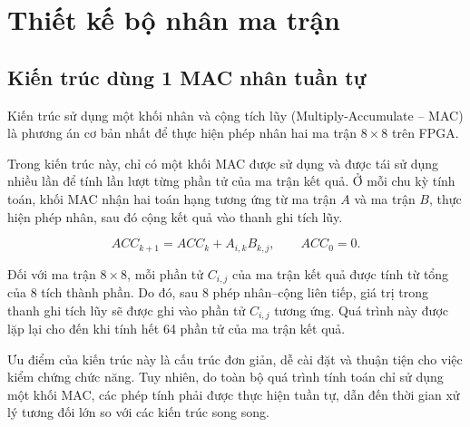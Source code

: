 \section{Thiết kế bộ nhân ma trận}

\subsection{Kiến trúc dùng 1 MAC nhân tuần tự}

Kiến trúc sử dụng một khối nhân và cộng tích lũy
(Multiply-Accumulate -- MAC) là phương án cơ bản nhất
để thực hiện phép nhân hai ma trận $8\times8$ trên FPGA.

Trong kiến trúc này, chỉ có một khối MAC được sử dụng
và được tái sử dụng nhiều lần để tính lần lượt từng phần tử
của ma trận kết quả. Ở mỗi chu kỳ tính toán, khối MAC
nhận hai toán hạng tương ứng từ ma trận $A$ và ma trận $B$,
thực hiện phép nhân, sau đó cộng kết quả vào thanh ghi tích lũy.

\begin{equation}
ACC_{k+1} = ACC_k + A_{i,k}B_{k,j},
\qquad ACC_0 = 0.
\end{equation}

Đối với ma trận $8\times8$, mỗi phần tử $C_{i,j}$ của ma trận
kết quả được tính từ tổng của 8 tích thành phần. Do đó,
sau 8 phép nhân--cộng liên tiếp, giá trị trong thanh ghi tích lũy
sẽ được ghi vào phần tử $C_{i,j}$ tương ứng. Quá trình này
được lặp lại cho đến khi tính hết 64 phần tử của ma trận kết quả.

Ưu điểm của kiến trúc này là cấu trúc đơn giản, dễ cài đặt
và thuận tiện cho việc kiểm chứng chức năng. Tuy nhiên,
do toàn bộ quá trình tính toán chỉ sử dụng một khối MAC,
các phép tính phải được thực hiện tuần tự, dẫn đến thời gian xử lý
tương đối lớn so với các kiến trúc song song.

